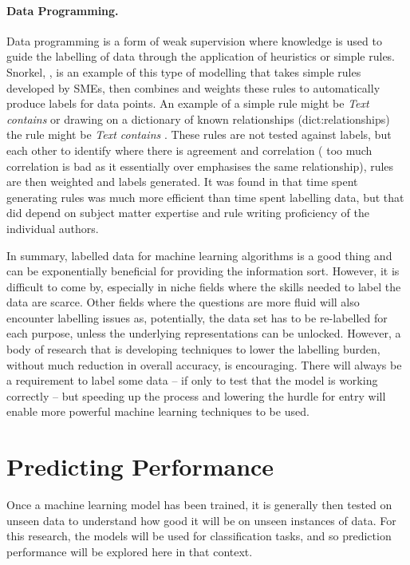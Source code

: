 \paragraph{Data Programming.}  Data programming is a form of weak supervision where knowledge is used to guide the labelling of data through the application of heuristics or simple rules. Snorkel, \parencite{ratner2017snorkel}, is an example of this type of modelling that takes simple rules developed by SMEs, then combines and weights these rules to automatically produce labels for data points. An example of a simple rule might be \emph{Text contains } or drawing on a dictionary of known relationships (dict:relationships) the rule might be \emph{Text contains }. These rules are not tested against labels, but each other to identify where there is agreement and correlation ( too much correlation is bad as it essentially over emphasises the same relationship), rules are then weighted and labels generated. It was found in \textcite{ratner2017snorkel} that time spent generating rules was much more efficient than time spent labelling data, but that did depend on subject matter expertise and rule writing proficiency of the individual authors.


In summary, labelled data for machine learning algorithms is a good thing and can be exponentially beneficial for providing the information sort. However, it is difficult to come by, especially in niche fields where the skills needed to label the data are scarce. Other fields where the questions are more fluid will also encounter labelling issues as, potentially, the data set has to be re-labelled for each purpose, unless the underlying representations can be unlocked. However, a body of research that is developing techniques to lower the labelling burden, without much reduction in overall accuracy, is encouraging. There will always be a requirement to label some data – if only to test that the model is working correctly – but speeding up the process and lowering the hurdle for entry will enable more powerful machine learning techniques to be used.


\section{Predicting Performance} Once a machine learning model has been trained, it is generally then tested on unseen data to understand how good it will be on unseen instances of data. For this research, the models will be used for classification tasks, and so prediction performance will be explored here in that context.

